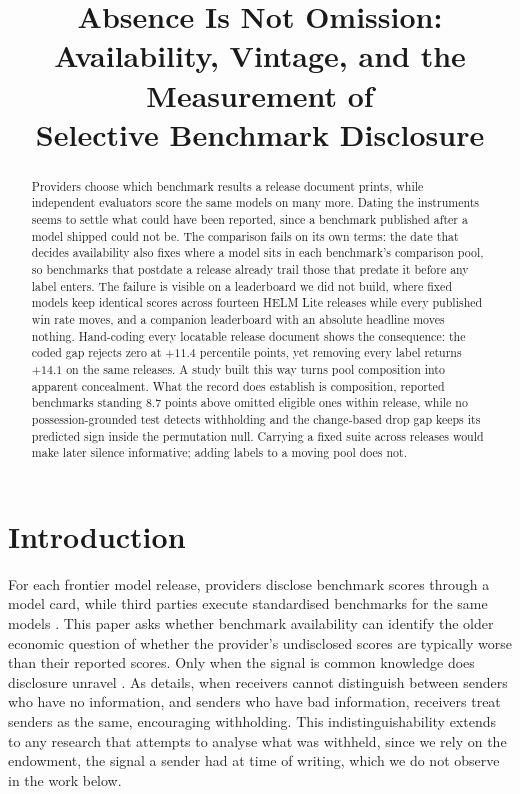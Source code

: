 \documentclass{article}
\title{\bf Absence Is Not Omission:\\
Availability, Vintage, and the Measurement of\\
Selective Benchmark Disclosure}
\author{}
\date{}
\begin{document}
\maketitle

\begin{abstract}
Providers choose which benchmark results a release document prints, while independent evaluators score the same models on many more. Dating the instruments seems to settle what could have been reported, since a benchmark published after a model shipped could not be. The comparison fails on its own terms: the date that decides availability also fixes where a model sits in each benchmark's comparison pool, so benchmarks that postdate a release already trail those that predate it before any label enters. The failure is visible on a leaderboard we did not build, where fixed models keep identical scores across fourteen HELM Lite releases while every published win rate moves, and a companion leaderboard with an absolute headline moves nothing. Hand-coding every locatable release document shows the consequence: the coded gap rejects zero at $+11.4$ percentile points, yet removing every label returns $+14.1$ on the same releases. A study built this way turns pool composition into apparent concealment. What the record does establish is composition, reported benchmarks standing 8.7 points above omitted eligible ones within release, while no possession-grounded test detects withholding and the change-based drop gap keeps its predicted sign inside the permutation null. Carrying a fixed suite across releases would make later silence informative; adding labels to a moving pool does not.
\end{abstract}
\section{Introduction}\label{sec:intro}

For each frontier model release, providers disclose benchmark scores through a model card, while third parties execute standardised benchmarks for the same models \citep{liang2022helm,epoch2026hub}. This paper asks whether benchmark availability can identify the older economic question of whether the provider's undisclosed scores are typically worse than their reported scores. Only when the signal is common knowledge does disclosure unravel \citep{grossman1981,milgrom1981}. As \citet{dye1985} details, when receivers cannot distinguish between senders who have no information, and senders who have bad information, receivers treat senders as the same, encouraging withholding. This indistinguishability extends to any research that attempts to analyse what was withheld, since we rely on the endowment, the signal a sender had at time of writing, which we do not observe in the work below.
\end{document}
